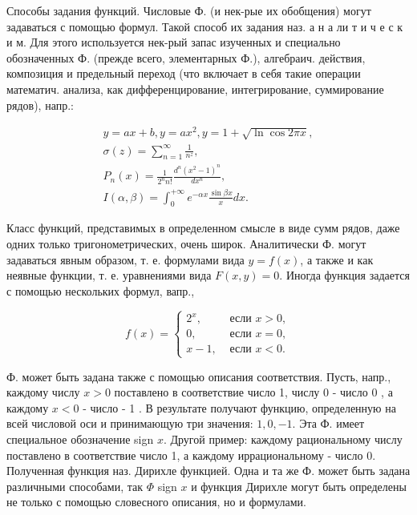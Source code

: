 \documentclass[10pt]{article}
\begin{document}
Способы задания функций. Числовые Ф. (и нек-рые их обобщения) могут задаваться с помощью формул. Такой способ их задания наз. а н а ли т и ч е с к и м. Для этого используется нек-рый запас изученных и специально обозначенных Ф. (прежде всего, элементарных Ф.), алгебраич. действия, композиция и предельный переход (что включает в себя такие операции математич. анализа, как дифференцирование, интегрирование, суммирование рядов), напр.:



\[

\begin{gathered}

y=a x+b, y=a x^{2}, y=1+\sqrt{\ln \cos 2 \pi x}, \\

\sigma(z)=\sum_{n=1}^{\infty} \frac{1}{n^{z}}, \\

P_{n}(x)=\frac{1}{2^{n} n !} \frac{d^{n}\left(x^{2}-1\right)^{n}}{d x^{n}}, \\

I(\alpha, \beta)=\int_{0}^{+\infty} e^{-\alpha x} \frac{\sin \beta x}{x} d x .

\end{gathered}

\]



Класс функций, представимых в определенном смысле в виде сумм рядов, даже одних только тригонометрических, очень широк. Аналитически Ф. могут задаваться явным образом, т. е. формулами вида $y=f(x)$, а также и как неявные функции, т. е. уравнениями вида $F(x, y)=0$. Иногда функция задается с помощью нескольких формул, вапр.,



\[

f(x)= \begin{cases}2^{x}, & \text { если } x>0, \\ 0, & \text { если } x=0, \\ x-1, & \text { если } x<0 .\end{cases}

\]



Ф. может быть задана также с помощью описания соответствия. Пусть, напр., каждому числу $x>0$ поставлено в соответствие число 1, числу 0 - число 0 , а каждому $x<0$ - число - 1 . В результате получают функцию, определенную на всей числовой оси и принимающую три значения: $1,0,-1$. Эта Ф. имеет специальное обозначение sign $x$. Другой пример: каждому рациональному числу поставлено в соответствие число 1, а каждому иррациональному - число 0. Полученная функция наз. Дирихле функцией. Одна и та же Ф. может быть задана различными способами, так $\Phi$ sign $x$ и функция Дирихле могут быть определены не только с помощью словесного описания, но и формулами.
\end{document}

